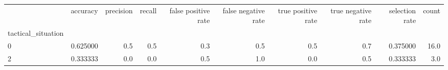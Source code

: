 \begin{tabular}{lrrrrrrrrr}
\toprule
{} &  accuracy &  precision &  recall &  false positive rate &  false negative rate &  true positive rate &  true negative rate &  selection rate &  count \\
tactical\_situation &           &            &         &                      &                      &                     &                     &                 &        \\
\midrule
0                  &  0.625000 &        0.5 &     0.5 &                  0.3 &                  0.5 &                 0.5 &                 0.7 &        0.375000 &   16.0 \\
2                  &  0.333333 &        0.0 &     0.0 &                  0.5 &                  1.0 &                 0.0 &                 0.5 &        0.333333 &    3.0 \\
\bottomrule
\end{tabular}
